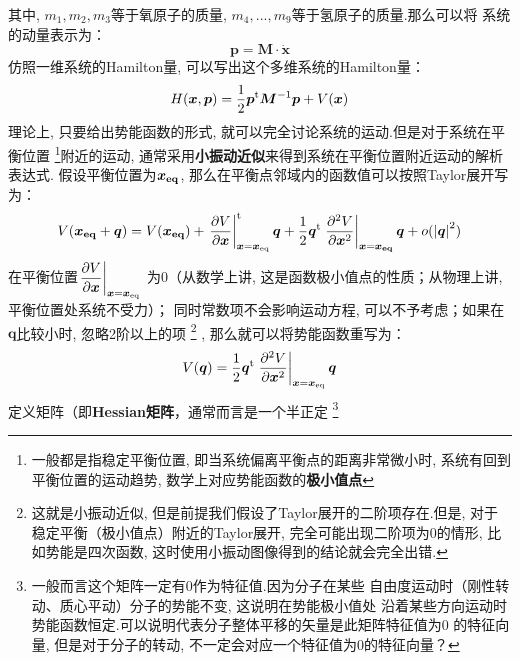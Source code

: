     其中, $m_1,m_2,m_3$等于氧原子的质量, $m_4,...,m_9$等于氢原子的质量.那么可以将
    系统的动量表示为：
    \begin{equation}
        \bm{p} = \bm{M}\cdot\dot{\bm{x}}
    \end{equation}
    仿照一维系统的Hamilton量, 可以写出这个多维系统的Hamilton量：
    \begin{equation}
        H(\bm{x}, \bm{p}) = \frac{1}{2}\bm{p}^{\mathrm{t}}\bm{M}^{-1}\bm{p} + V(\bm{x})
    \end{equation}
    理论上, 只要给出势能函数的形式, 就可以完全讨论系统的运动.但是对于系统在平衡位置
    \footnote{一般都是指稳定平衡位置, 即当系统偏离平衡点的距离非常微小时, 
    系统有回到平衡位置的运动趋势, 数学上对应势能函数的\textbf{极小值点}
    }附近的运动, 通常采用\textbf{小振动近似}来得到系统在平衡位置附近运动的解析表达式.
    假设平衡位置为$\bm{x_{\mathrm{eq}}}$, 那么在平衡点邻域内的函数值可以按照Taylor展开写为：
    \begin{equation}
        \begin{split}
        V(\bm{x_{\mathrm{eq}}} + \bm{q}) &= V(\bm{x_{\mathrm{eq}}}) + \left.\frac{\partial{V}}{\partial{\bm{x}}}\right|_{\bm{x} = \bm{x}_{\mathrm{eq}}}^{\mathrm{t}}\bm{q}
         + \frac{1}{2}\bm{q}^{\mathrm{t}}\left.\frac{\partial{^2V}}{\partial{\bm{x}^2}}\right|_{\bm{x} = \bm{x_{\mathrm{eq}}}}\bm{q} + o(\left|\bm{q}\right|^2)\\
        \end{split}
    \end{equation}
    在平衡位置$\displaystyle\left.\frac{\partial{V}}{\partial{\bm{x}}}\right|_{\bm{x} = \bm{x}_{\mathrm{eq}}}$
    为0（从数学上讲, 这是函数极小值点的性质；从物理上讲, 平衡位置处系统不受力）；
    同时常数项不会影响运动方程, 可以不予考虑；如果在$\bm{q}$比较小时, 忽略2阶以上的项
    \footnote{这就是小振动近似, 但是前提我们假设了Taylor展开的二阶项存在.但是, 
    对于稳定平衡（极小值点）附近的Taylor展开, 完全可能出现二阶项为0的情形, 
    比如势能是四次函数, 这时使用小振动图像得到的结论就会完全出错.
    }
    , 那么就可以将势能函数重写为：
    \begin{equation}
        V(\bm{q}) = \frac{1}{2}\bm{q}^{\mathrm{t}}\left.\frac{\partial{^2V}}{\partial{\bm{x}^2}}\right|_{\bm{x} = \bm{x}_{\mathrm{eq}}}\bm{q}
        \label{potential at equilibrium point}
    \end{equation}
    定义矩阵（即\textbf{Hessian矩阵}，通常而言是一个半正定
    \footnote{
        一般而言这个矩阵一定有0作为特征值.因为分子在某些
        自由度运动时（刚性转动、质心平动）分子的势能不变, 这说明在势能极小值处
        沿着某些方向运动时势能函数恒定.可以说明代表分子整体平移的矢量是此矩阵特征值为0
        的特征向量, 但是对于分子的转动, 不一定会对应一个特征值为0的特征向量？
    }
